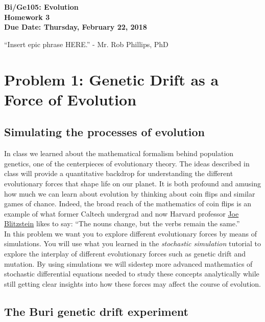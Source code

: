 \documentclass[12pt]{article}    %
\begin{document}
\relax


\begin{center}
{\bf\Large Bi/Ge105: Evolution}\\
{\bf\Large Homework 3}\\
{\bf\Large Due Date: Thursday, February 22, 2018}\\
\end{center}

``Insert epic phrase HERE.''  - Mr. Rob Phillips, PhD\\

\section{Problem 1: Genetic Drift as a Force of Evolution}
\subsection{Simulating the  processes of evolution}

In class we learned about the mathematical formalism behind population
genetics, one of the centerpieces of evolutionary theory. The ideas described in
class will provide a quantitative backdrop for understanding the different
evolutionary forces that shape life on our planet. It is both profound and
amusing how much we can learn about evolution by thinking about coin flips and
similar games of chance. Indeed, the broad reach of the mathematics of coin
flips is an example of what former Caltech undergrad and now Harvard professor
\href{http://www.people.fas.harvard.edu/~blitz/Site/Home.html}{Joe Blitzstein}
likes to say: ``The nouns change, but the verbs remain the same.'' \\

In this  problem we want you to explore different evolutionary forces by means
of simulations. You will use what you learned in the \textit{stochastic
simulation} tutorial to explore the interplay of different evolutionary forces
such as genetic drift and mutation. By using simulations we will sidestep more
advanced mathematics of stochastic differential equations  needed to study these
concepts analytically while still getting clear insights into how these forces
may affect the course of evolution.

\subsection{The Buri genetic drift experiment}
\end{document}
